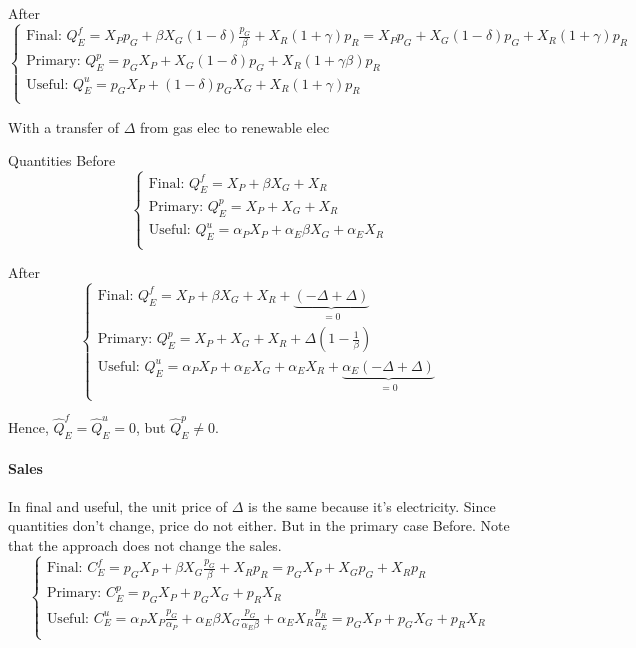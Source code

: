\documentclass[11pt]{article}
\begin{document}
After
\begin{equation*}
    \begin{cases}
        \text{Final: }Q_E^f=X_Pp_G+\beta X_G(1-\delta)\frac{p_G}{\beta}+X_R(1+\gamma)p_R=X_Pp_G+ X_G(1-\delta)p_G+X_R(1+\gamma)p_R\\
         \text{Primary: }Q_E^p= p_GX_P+ X_G(1-\delta)p_G+X_R(1+\gamma\beta)p_R \\
        \text{Useful: }Q_E^u= p_GX_P+ (1-\delta)p_G X_G+ X_R (1+\gamma)p_R  \\
    \end{cases}
\end{equation*}


With a transfer of $\Delta$ from gas elec to renewable elec


Quantities
Before
\begin{equation*}
    \begin{cases}
        \text{Final: }Q_E^f=X_P+\beta X_G+X_R \\
         \text{Primary: }Q_E^p=X_P+ X_G+X_R \\
        \text{Useful: }Q_E^u=\alpha_P X_P+ \alpha_E\beta X_G+\alpha_E X_R \\
    \end{cases}
\end{equation*}

After
\begin{equation*}
    \begin{cases}
        \text{Final: }Q_E^f=X_P+\beta X_G+X_R + \underbrace{(-\Delta + \Delta )}_{=0}\\
         \text{Primary: }Q_E^p= X_P+ X_G+X_R +  \Delta(1-\frac{1}{\beta}) \\
        \text{Useful: }Q_E^u=\alpha_P X_P+ \alpha_EX_G+\alpha_E X_R + \underbrace{\alpha_E(-\Delta + \Delta )}_{=0}  \\
    \end{cases}
\end{equation*}

Hence, $\hat{Q}_E^f=\hat{Q}_E^u=0$, but $\hat{Q}_E^p\neq0$.


\paragraph{Sales}
In final and useful, the unit price of $\Delta$ is the same because it's electricity. Since quantities don't change, price do not either. But in the primary case
Before. Note that the approach does not change the sales.
\begin{equation*}
    \begin{cases}
        \text{Final: }C_E^f=p_GX_P+\beta X_G\frac{p_G}{\beta}+X_Rp_R=p_GX_P+ X_Gp_G+X_Rp_R \\
         \text{Primary: }C_E^p=p_GX_P+ p_GX_G+p_RX_R \\
        \text{Useful: }C_E^u=\alpha_P X_P\frac{p_G}{\alpha_P}+ \alpha_E\beta X_G\frac{p_G}{\alpha_E\beta}+\alpha_E X_R\frac{p_R}{\alpha_E}=p_GX_P+ p_GX_G+p_RX_R \\
    \end{cases}
\end{equation*}
\end{document}
